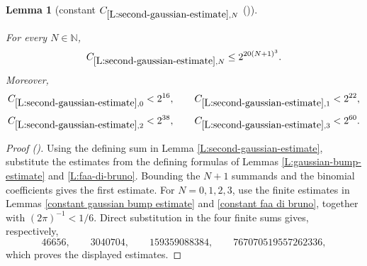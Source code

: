 \documentclass[12pt,reqno]{amsart}
\newcommand{\auto}{{({\tiny\faCar})}}
\theoremstyle{plain}
\newtheorem{lemma}[theorem]{Lemma}
\numberwithin{equation}{section}
\theoremstyle{remark}
\newcommand{\uses}[1]{}
\newcommand{\usesdefs}[1]{}
\newcommand{\leanok}{}
\newcommand{\lean}[1]{}
\newcommand{\N}{{\mathbb N}}
\begin{document}
\begin{lemma}[constant $C_{\ref{L:second-gaussian-estimate},N}$ \auto]\label{constant second gaussian estimate}\uses{L:gaussian-bump-estimate,L:faa-di-bruno,constant gaussian bump estimate,constant faa di bruno,L:second-gaussian-estimate}\usesdefs{}
\lean{Auto.constantSecondGaussianEstimate}
\leanok
For every $N\in\N$,
\begin{equation}\label{constant second gaussian estimate bound}
C_{\ref{L:second-gaussian-estimate},N}\le2^{20(N+1)^3}.
\end{equation}
Moreover,
\begin{equation}\label{auto:constant-second-gaussian-estimate-small}
C_{\ref{L:second-gaussian-estimate},0}<2^{16},
\qquad
C_{\ref{L:second-gaussian-estimate},1}<2^{22},
\end{equation}
\begin{equation}\label{auto:constant-second-gaussian-estimate-small-high}
C_{\ref{L:second-gaussian-estimate},2}<2^{38},
\qquad
C_{\ref{L:second-gaussian-estimate},3}<2^{60}.
\end{equation}
\end{lemma}
\begin{proof}[Proof \auto]
Using the defining sum in Lemma \ref{L:second-gaussian-estimate}, substitute the estimates from the defining formulas of Lemmas \ref{L:gaussian-bump-estimate} and \ref{L:faa-di-bruno}. Bounding the $N+1$ summands and the binomial coefficients gives the first estimate. For $N=0,1,2,3$, use the finite estimates in Lemmas \ref{constant gaussian bump estimate} and \ref{constant faa di bruno}, together with $(2\pi)^{-1}<1/6$. Direct substitution in the four finite sums gives, respectively,
\[
46656,\qquad 3040704,\qquad 159359088384,\qquad 767070519557262336,
\]
which proves the displayed estimates.
\end{proof}
\end{document}
